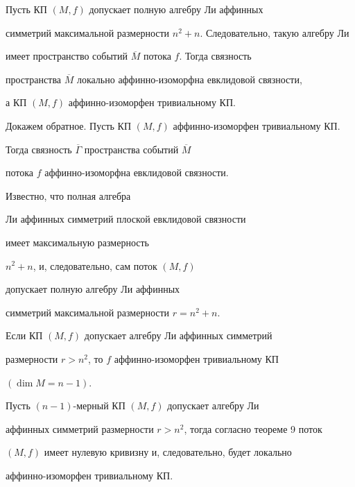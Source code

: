 \begin{pf}


Пусть КП $(M,f) $ допускает полную алгебру Ли аффинных


симметрий максимальной размерности $n^2+n$. Следовательно, такую алгебру Ли


имеет пространство событий $\overline{M} $ потока $f$. Тогда связность


пространства $\overline{M} $ локально аффинно-изоморфна евклидовой связности,


а КП $(M,f) $ аффинно-изоморфен тривиальному КП.





Докажем обратное. Пусть КП $(M,f) $ аффинно-изоморфен тривиальному КП.


Тогда связность $\overline{\Gamma} $ пространства событий $\overline{M}$


потока $f$ аффинно-изоморфна евклидовой связности. 


Известно, что полная алгебра


Ли аффинных симметрий плоской евклидовой связности 


имеет максимальную размерность


$n^2+n$, и, следовательно, сам поток $(M,f) $ 


допускает полную алгебру Ли аффинных


симметрий максимальной размерности $r=n^2+n$.


\end{pf}





\begin{thm}


Если КП $(M,f) $ допускает алгебру Ли аффинных симметрий


размерности $r>n^2$, то $f$ аффинно-изоморфен тривиальному КП


$(\dim M=n-1)$.


\end{thm}





\begin{pf}


Пусть $(n-1)$-мерный КП $(M,f) $ допускает алгебру Ли


аффинных симметрий размерности $r>n^2$, тогда согласно теореме 9 поток


$(M,f) $ имеет нулевую кривизну и, следовательно, будет локально


аффинно-изоморфен тривиальному КП.


\end{pf}





